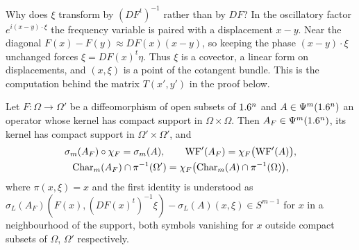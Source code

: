 \begin{discussion}
  Why does $\xi$ transform by $(DF^t)^{-1}$ rather than by $DF$? In the
  oscillatory factor $e^{i(x-y)\cdot\xi}$ the frequency variable is paired with
  a displacement $x-y$. Near the diagonal $F(x)-F(y)\approx DF(x)(x-y)$, so
  keeping the phase $(x-y)\cdot\xi$ unchanged forces
  $\xi=DF(x)^t\eta$. Thus $\xi$ is a covector, a linear form on displacements,
  and $(x,\xi)$ is a point of the cotangent bundle. This is the computation
  behind the matrix $T(x',y')$ in the proof below.
\end{discussion}

\begin{theorem}\label{microlocal:thm:coordinates}
  Let $F:\Omega\to\Omega'$ be a diffeomorphism of open subsets of $1.6^n$ and
  $A\in\Psi^{m}(1.6^n)$ an operator whose kernel has compact support in
  $\Omega\times\Omega$. Then $A_F\in\Psi^{m}(1.6^n)$, its kernel has compact
  support in $\Omega'\times\Omega'$, and
  \begin{gather*}
    \sigma_m(A_F)\circ\chi_F=\sigma_m(A),\qquad
    \operatorname{WF}'(A_F)=\chi_F\bigl(\operatorname{WF}'(A)\bigr),\\
    \operatorname{Char}_m(A_F)\cap\pi^{-1}(\Omega')=\chi_F\bigl(\operatorname{Char}_m(A)\cap\pi^{-1}(\Omega)\bigr),
  \end{gather*}
  where $\pi(x,\xi)=x$ and the first identity is understood as
  $\sigma_L(A_F)(F(x),(DF(x)^t)^{-1}\xi)-\sigma_L(A)(x,\xi)\in S^{m-1}$ for
  $x$ in a neighbourhood of the support, both symbols vanishing for $x$
  outside compact subsets of $\Omega$, $\Omega'$ respectively.
\end{theorem}
